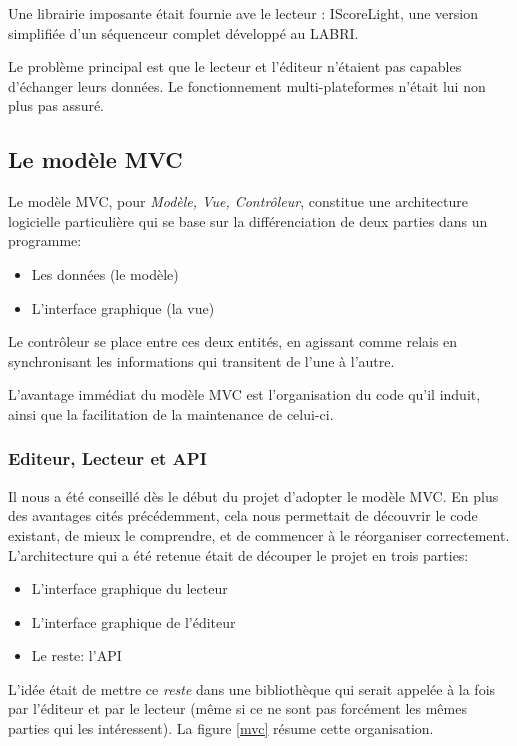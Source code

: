 \documentclass[a4paper,11pt]{article}
\begin{document}
Une librairie imposante était fournie ave le lecteur : IScoreLight, une version simplifiée d'un séquenceur complet développé au \ac{LABRI}.

Le problème principal est que le lecteur et l'éditeur n'étaient pas capables d'échanger leurs données. Le fonctionnement multi-plateformes n'était lui non plus pas assuré.

\subsection{Le modèle MVC}

Le modèle MVC, pour \textit{Modèle, Vue, Contrôleur}, constitue une architecture logicielle particulière qui se base sur la différenciation de deux parties dans un programme:
\begin{itemize}
 \item Les données (le modèle)
 \item L'interface graphique (la vue)
\end{itemize}

Le contrôleur se place entre ces deux entités, en agissant comme relais en synchronisant les informations qui transitent de l'une à l'autre.

L'avantage immédiat du modèle MVC est l'organisation du code qu'il induit, ainsi que la facilitation de la maintenance de celui-ci.

\subsubsection{Editeur, Lecteur et API}

Il nous a été conseillé dès le début du projet d'adopter le modèle MVC. En plus des avantages cités précédemment, cela nous permettait de découvrir le code existant, de mieux le comprendre, et de commencer à le réorganiser correctement. L'architecture qui a été retenue était de découper le projet en trois parties:
\begin{itemize}
 \item L'interface graphique du lecteur
 \item L'interface graphique de l'éditeur
 \item Le reste: l'API
\end{itemize}
L'idée était de mettre ce \textit{reste} dans une bibliothèque qui serait appelée à la fois par l'éditeur et par le lecteur (même si ce ne sont pas forcément les mêmes parties qui les intéressent). La figure \ref{mvc} résume cette organisation.
\end{document}
